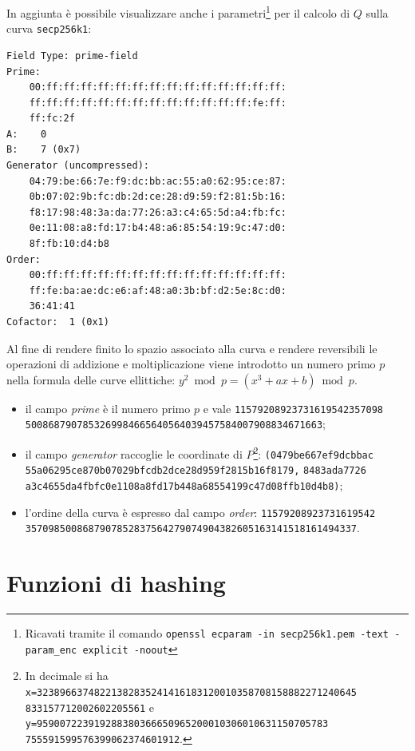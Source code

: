 In aggiunta è possibile visualizzare anche i parametri\footnote{Ricavati tramite il comando \texttt{openssl ecparam -in secp256k1.pem -text -param\_enc explicit -noout}} per il calcolo di $Q$ sulla curva \texttt{secp256k1}:
\begin{lstlisting}[frame=none]
Field Type: prime-field
Prime:
    00:ff:ff:ff:ff:ff:ff:ff:ff:ff:ff:ff:ff:ff:ff:
    ff:ff:ff:ff:ff:ff:ff:ff:ff:ff:ff:ff:ff:fe:ff:
    ff:fc:2f
A:    0
B:    7 (0x7)
Generator (uncompressed):
    04:79:be:66:7e:f9:dc:bb:ac:55:a0:62:95:ce:87:
    0b:07:02:9b:fc:db:2d:ce:28:d9:59:f2:81:5b:16:
    f8:17:98:48:3a:da:77:26:a3:c4:65:5d:a4:fb:fc:
    0e:11:08:a8:fd:17:b4:48:a6:85:54:19:9c:47:d0:
    8f:fb:10:d4:b8
Order:
    00:ff:ff:ff:ff:ff:ff:ff:ff:ff:ff:ff:ff:ff:ff:
    ff:fe:ba:ae:dc:e6:af:48:a0:3b:bf:d2:5e:8c:d0:
    36:41:41
Cofactor:  1 (0x1)
\end{lstlisting}
Al fine di rendere finito lo spazio associato alla curva e rendere reversibili le operazioni di addizione e moltiplicazione viene introdotto un numero primo $p$ nella formula delle curve ellittiche: $y^2 \bmod p =(x^3+ax+b) \bmod p$.
\begin{itemize}
    \item il campo \textit{prime} è il numero primo $p$ e vale \texttt{11579208923731619542357098\\5008687907853269984665640564039457584007908834671663};
    \item il campo \textit{generator} raccoglie le coordinate di $P$\footnote{In decimale si ha \texttt{x=32389663748221382835241416183120010358708158882271240645\\833157712002602205561} e \texttt{y=959007223919288380366650965200010306010631150705783\\755591599576399062374601912}.}: \texttt{(0479be667ef9dcbbac\\55a06295ce870b07029bfcdb2dce28d959f2815b16f8179,} \texttt{8483ada7726\\a3c4655da4fbfc0e1108a8fd17b448a68554199c47d08ffb10d4b8)};
\item l'ordine della curva è espresso dal campo \textit{order}: \texttt{11579208923731619542\\3570985008687907852837564279074904382605163141518161494337}.
\end{itemize}

\section{Funzioni di hashing}\label{sec:funzioni-hashing}

